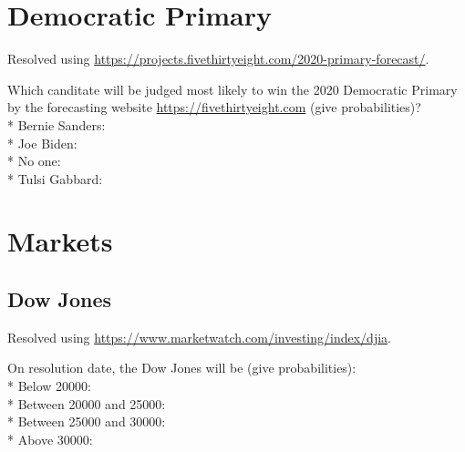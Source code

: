 \documentclass{article}
\begin{document}
\section*{Democratic Primary}

Resolved using
\href{https://projects.fivethirtyeight.com/2020-primary-forecast/}{https://projects.fivethirtyeight.com/2020-primary-forecast/}.

\vspace{0.5cm}

Which canditate will be judged most likely to win the
2020 Democratic Primary by the forecasting website
\href{https://fivethirtyeight.com}{https://fivethirtyeight.com} (give probabilities)?\\*
Bernie Sanders: \null\hfill\underline{\hspace{5cm}}\\*
Joe Biden: \null\hfill\underline{\hspace{5cm}}\\*
No one: \null\hfill\underline{\hspace{5cm}}\\*
Tulsi Gabbard: \null\hfill\underline{\hspace{5cm}}

\section*{Markets}

\subsection*{Dow Jones}

Resolved using
\href{https://www.marketwatch.com/investing/index/djia}{https://www.marketwatch.com/investing/index/djia}.

\vspace{0.5cm}

On resolution date, the Dow Jones will be (give probabilities):\\*
Below 20000: \null\hfill\underline{\hspace{5cm}}\\*
Between 20000 and 25000: \null\hfill\underline{\hspace{5cm}}\\*
Between 25000 and 30000: \null\hfill\underline{\hspace{5cm}}\\*
Above 30000: \null\hfill\underline{\hspace{5cm}}
\end{document}
